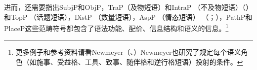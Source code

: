 进而，还需要指出SubjP和ObjP，TraP（及物短语）和IntraP （不及物短语）（\citealp[]{Karimi-Doostan2005a}）和TopP （话题短语），DistP （数量短语），AspP （情态短语） （\citealp[]{EKiss2003a-u}；\citealp[]{Karimi2005a}），PathP和PlaceP\citep[]{Svenonius2004a-u}这些范畴符号都包含了语法功能、配价、信息结构和语义的信息。\footnote{%
更多例子和参考资料请看Newmeyer（\citeyear[]{Newmeyer2004b}、\citeyear[]{Newmeyer2005a}）Newmeyer也研究了规定每个语义角色（如施事、受益格、工具、致事、随伴格和逆行格短语）投射的条件。
}
%
